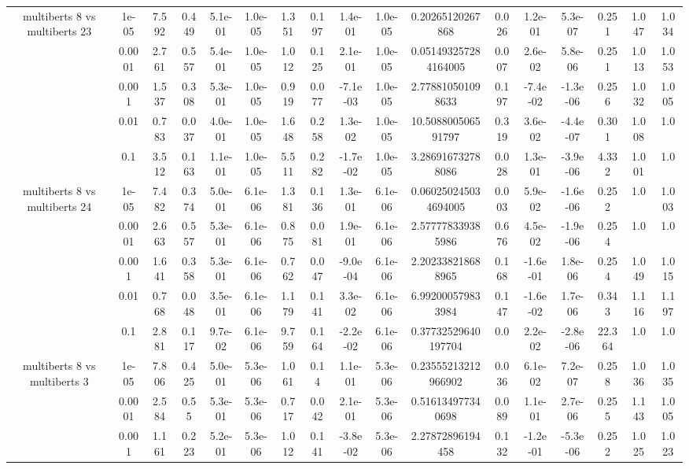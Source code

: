 \begin{tabular}{|c|c|c|c|c|c|c|c|c|c|c|c|c|c|c|c|c|}
\hline
\multirow{5}{*}{multiberts 8 vs multiberts 23} & 1e-05 & 7.592 & 0.449 & 5.1e-01 & 1.0e-05 & 1.351 & 0.197 & 1.4e-01 & 1.0e-05 & 0.20265120267868 & 0.026 & 1.2e-01 & 5.3e-07 & 0.251 & 1.047 & 1.034 \\
 & 0.0001 & 2.761 & 0.557 & 5.4e-01 & 1.0e-05 & 1.012 & 0.125 & 2.1e-01 & 1.0e-05 & 0.051493257284164005 & 0.007 & 2.6e-02 & 5.8e-06 & 0.251 & 1.013 & 1.053 \\
 & 0.001 & 1.537 & 0.308 & 5.3e-01 & 1.0e-05 & 0.919 & 0.077 & -7.1e-03 & 1.0e-05 & 2.778810501098633 & 0.197 & -7.4e-02 & -1.3e-06 & 0.256 & 1.032 & 1.005 \\
 & 0.01 & 0.783 & 0.037 & 4.0e-01 & 1.0e-05 & 1.648 & 0.258 & 1.3e-02 & 1.0e-05 & 10.508800506591797 & 0.319 & 3.6e-02 & -4.4e-07 & 0.301 & 1.008 & 1.0 \\
 & 0.1 & 3.512 & 0.163 & 1.1e-01 & 1.0e-05 & 5.511 & 0.282 & -1.7e-02 & 1.0e-05 & 3.286916732788086 & 0.028 & 1.3e-01 & -3.9e-06 & 4.332 & 1.001 & 1.0 \\
\hline
\multirow{5}{*}{multiberts 8 vs multiberts 24} & 1e-05 & 7.482 & 0.374 & 5.0e-01 & 6.1e-06 & 1.381 & 0.136 & 1.3e-01 & 6.1e-06 & 0.060250245034694005 & 0.003 & 5.9e-02 & -1.6e-06 & 0.252 & 1.0 & 1.003 \\
 & 0.0001 & 2.663 & 0.557 & 5.3e-01 & 6.1e-06 & 0.875 & 0.081 & 1.9e-01 & 6.1e-06 & 2.577778339385986 & 0.676 & 4.5e-02 & -1.9e-06 & 0.254 & 1.0 & 1.0 \\
 & 0.001 & 1.641 & 0.358 & 5.3e-01 & 6.1e-06 & 0.762 & 0.047 & -9.0e-04 & 6.1e-06 & 2.202338218688965 & 0.168 & -1.6e-01 & 1.8e-06 & 0.254 & 1.049 & 1.015 \\
 & 0.01 & 0.768 & 0.048 & 3.5e-01 & 6.1e-06 & 1.179 & 0.141 & 3.3e-02 & 6.1e-06 & 6.992000579833984 & 0.147 & -1.6e-02 & 1.7e-06 & 0.343 & 1.116 & 1.197 \\
 & 0.1 & 2.881 & 0.117 & 9.7e-02 & 6.1e-06 & 9.759 & 0.164 & -2.2e-02 & 6.1e-06 & 0.37732529640197704 & 0.0 & 2.2e-02 & -2.8e-06 & 22.364 & 1.0 & 1.0 \\
\hline
\multirow{5}{*}{multiberts 8 vs multiberts 3} & 1e-05 & 7.806 & 0.425 & 5.0e-01 & 5.3e-06 & 1.061 & 0.14 & 1.1e-01 & 5.3e-06 & 0.23555213212966902 & 0.036 & 6.1e-02 & 7.2e-07 & 0.258 & 1.036 & 1.035 \\
 & 0.0001 & 2.584 & 0.55 & 5.3e-01 & 5.3e-06 & 0.717 & 0.042 & 2.1e-01 & 5.3e-06 & 0.516134977340698 & 0.089 & 1.1e-01 & 2.7e-06 & 0.255 & 1.143 & 1.005 \\
 & 0.001 & 1.161 & 0.223 & 5.2e-01 & 5.3e-06 & 1.012 & 0.141 & -3.8e-02 & 5.3e-06 & 2.27872896194458 & 0.132 & -1.2e-01 & -5.3e-06 & 0.252 & 1.025 & 1.023 \\

\end{tabular}
